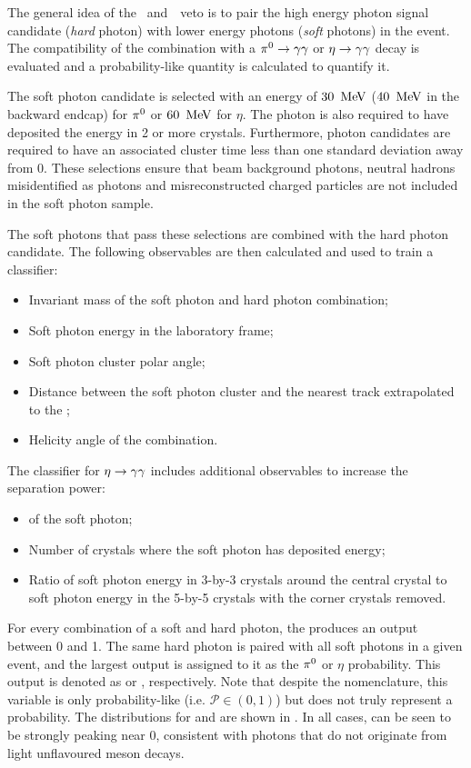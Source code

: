 The general idea of the \piz~and~\eta~veto is to pair the high energy photon signal candidate (\textit{hard} photon) with lower energy photons (\textit{soft} photons) in the event.
The compatibility of the combination with a $\pi^0\rightarrow\gamma\gamma$ or $\eta\rightarrow\gamma\gamma$ decay is evaluated and a probability-like quantity is calculated to quantify it.

The soft photon candidate is selected with an energy of $30~\mathrm{\,Me\kern -0.1em V}$ ($40~\mathrm{\,Me\kern -0.1em V}$ in the backward \ECL endcap) for $\pi^0$ or $60~\mathrm{\,Me\kern -0.1em V}$ for $\eta$.
The photon is also required to have deposited the energy in 2 or more crystals.
Furthermore, photon candidates are required to have an associated cluster time less than one standard deviation away from 0.
These selections ensure that beam background photons, neutral hadrons misidentified as photons and misreconstructed charged particles are not included in the soft photon sample.

The soft photons that pass these selections are combined with the hard photon candidate.
The following observables are then calculated and used to train a \MVA classifier:
\begin{itemize}
    \item Invariant mass of the soft photon and hard photon combination;
    \item Soft photon energy in the laboratory frame;
    \item Soft photon \ECL cluster polar angle;
    \item Distance between the soft photon \ECL cluster and the nearest track extrapolated to the \ECL;
    \item Helicity angle of the combination.
\end{itemize}
The classifier for $\eta\rightarrow\gamma\gamma$ includes additional observables to increase the separation power:
\begin{itemize}
    \item \ZMVA of the soft photon;
    \item Number of crystals where the soft photon has deposited energy;
    \item Ratio of soft photon energy in 3-by-3 crystals around the central crystal to soft photon energy in the 5-by-5 crystals with the corner crystals removed.
\end{itemize}
For every combination of a soft and hard photon, the \MVA produces an output between 0 and 1.
The same hard photon is paired with all soft photons in a given event, and the largest \MVA output is assigned to it as the $\pi^0$ or $\eta$ probability.
This \MVA output is denoted as \piVeto or \etaVeto, respectively.
Note that despite the nomenclature, this variable is only probability-like (i.e. $\mathcal{P}\in(0,1)$) but does not truly represent a probability.
The distributions for \piVeto and \etaVeto are shown in .
In all cases, \BtoXsgamma can be seen to be strongly peaking near 0, consistent with photons that do not originate from light unflavoured meson decays.

